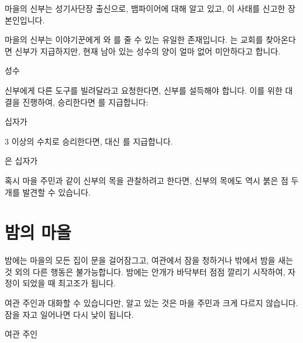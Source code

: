 \documentclass{report}
\begin{document}
	마을의 신부는 성기사단장 출신으로, 뱀파이어에 대해 알고 있고, 이 사태를 신고한 장본인입니다.
	
	마을의 신부는 이야기꾼에게 와 를 줄 수 있는 유일한 존재입니다. 는 교회를 찾아온다면 신부가 지급하지만, 현재 남아 있는 성수의 양이 얼마 없어 미안하다고 합니다.
	
	\begin{lite}{성수}
		\subject{분산된 타락도 타격할 수 있게 해주는 것.}
		
	\end{lite}
	
	신부에게 다른 도구를 빌려달라고 요청한다면, 신부를 설득해야 합니다. 이를 위한 대결을 진행하여, 승리한다면 를 지급합니다:
	
	\begin{lite}{십자가}
		\subject{타락한 이에게 영구적인 손상을 입히는 것.}
		
	\end{lite}
	
	3 이상의 수치로 승리한다면,  대신 를 지급합니다.
	
	\begin{lite}{은 십자가}
		\subject{타락한 이에게 영구적인 손상을 입히는 것.}
	\end{lite}
	
	혹시 마을 주민과 같이 신부의 목을 관찰하려고 한다면, 신부의 목에도 역시 붉은 점 두개를 발견할 수 있습니다.
	
	\section{밤의 마을}
	밤에는 마을의 모든 집이 문을 걸어잠그고, 여관에서 잠을 청하거나 밖에서 밤을 새는 것 외의 다른 행동은 불가능합니다. 밤에는 안개가 바닥부터 점점 깔리기 시작하여, 자정이 되었을 때 최고조가 됩니다.
	
	여관 주인과 대화할 수 있습니다만, 알고 있는 것은 마을 주민과 크게 다르지 않습니다. 잠을 자고 일어나면 다시 낮이 됩니다.
	
	\begin{lite}{여관 주인}
		\subject[\solidsepline]{내 가게, 내 규칙}
		
		\subject{돈이 최고야}
	\end{lite}
	
\end{document}
